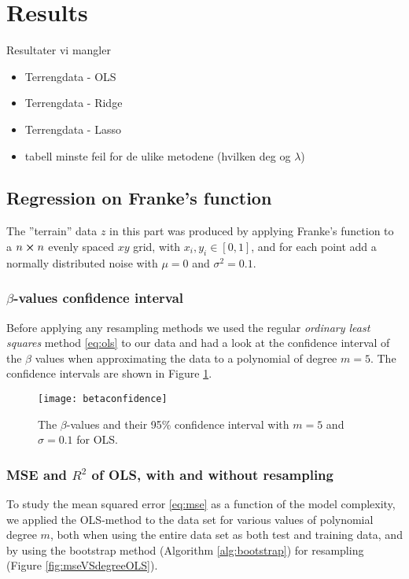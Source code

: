 \section{Results}
\label{sec:results}
Resultater vi mangler
\begin{itemize}
\item Terrengdata - OLS
\item Terrengdata - Ridge
\item Terrengdata - Lasso
\item tabell minste feil for de ulike metodene (hvilken deg og $\lambda$)
\end{itemize}
\subsection{Regression on Franke's function}
The {''}terrain'' data $z$ in this part was produced by applying Franke's function to a $n\cross n$ evenly spaced $xy$ grid, with $x_i,y_i\in [0,1]$, and for each point add a normally distributed noise with $\mu = 0$ and $\sigma^2 = 0.1$.
\subsubsection{$\beta$-values confidence interval}
Before applying any resampling methods we used the regular \emph{ordinary least squares} method \eqref{eq:ols} to our data and had a look at the confidence interval of the $\beta$ values when approximating the data to a polynomial of degree $m=5$. The confidence intervals are shown in Figure \ref{fig:betaconfidence}.

\begin{figure}[htbp]
	\centering
	\texttt{[image: betaconfidence]}
	\caption{The $\beta$-values and their 95\% confidence interval with $m=5$ and $\sigma=0.1$ for OLS.}
	\label{fig:betaconfidence}
\end{figure}

\subsubsection{MSE and $R^2$ of OLS, with and without resampling}
To study the mean squared error \eqref{eq:mse} as a function of the model complexity, we applied the OLS-method to the data set for various values of polynomial degree $m$, both when using the entire data set as both test and training data, and by using the bootstrap method (Algorithm \ref{alg:bootstrap}) for resampling (Figure \ref{fig:mseVSdegreeOLS}).

